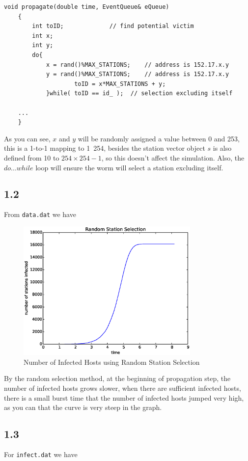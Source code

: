 \documentclass[10pt]{article}
\begin{document}
\begin{lstlisting}
void propagate(double time, EventQueue& eQueue)
	{
		int toID;             // find potential victim
		int x;
		int y;
		do{
			x = rand()%MAX_STATIONS;  	// address is 152.17.x.y
			y = rand()%MAX_STATIONS;  	// address is 152.17.x.y
            		toID = x*MAX_STATIONS + y;
			}while( toID == id_ );	// selection excluding itself

    ...
    }
\end{lstlisting}
As you can see, $x$ and $y$ will be randomly assigned a value between 0 and 253, this is a 1-to-1 mapping to 1~254, besides the station vector object $s$ is also defined from 10 to $254\times254-1$, so this doesn't affect the simulation. Also, the $do...while$ loop will ensure the worm will select a station excluding itself.

\subsection*{1.2}
From \texttt{data.dat} we have
\begin{figure}[H]
\begin{center}
\includegraphics[width=0.8\textwidth]{figure1.2.eps}
\caption{Number of Infected Hosts using Random Station Selection}
\end{center}
\end{figure}

By the random selection method, at the beginning of propagation step, the number of infected hosts grows slower, when there are sufficient infected hosts, there is a small burst time that the number of infected hosts jumped very high, as you can that the curve is very steep in the graph.

\subsection*{1.3}
For \texttt{infect.dat} we have
\end{document}
